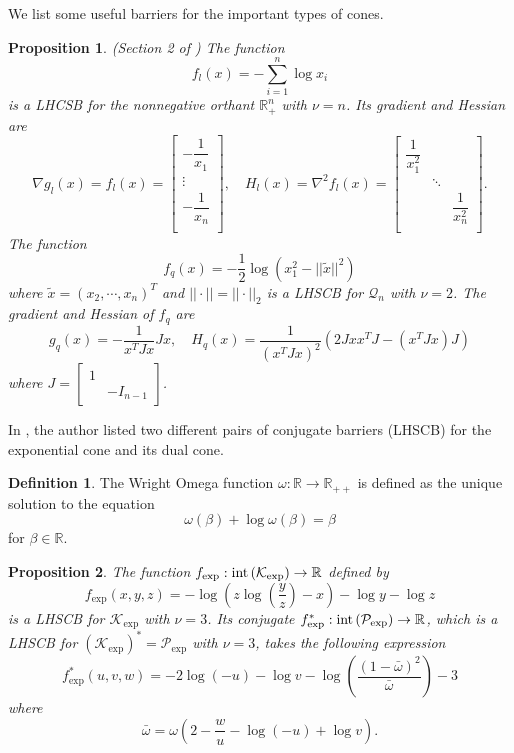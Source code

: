 \documentclass[11pt]{article}
\theoremstyle{definition}
\newtheorem{defin}{Definition}
\theoremstyle{plain}
\newtheorem{prop}{Proposition}
\begin{document}
We list some useful barriers for the important types of cones.

\begin{prop} \label{barriers_for_linear_and_lorentz_cone}
	\textnormal{(Section 2 of \cite{CVX})} The function 
	\[f_l(x) =-\sum_{i=1}^n \log x_i\]
	is a LHCSB for the nonnegative orthant $\mathbb{R}_+^{n}$ with $\nu = n$. Its gradient and Hessian are
	\[\nabla g_l(x) = f_l(x)= \begin{bmatrix}
	-\dfrac{1}{x_1} \\[2ex] \vdots \\[2ex] -\dfrac{1}{x_n} \\[1ex]
	\end{bmatrix},\quad 
	H_l(x) = \nabla^2 f_l(x) = \begin{bmatrix}
	\dfrac{1}{x_1^2} & 			  &				 			 \\[2ex] 
							& \ddots &						    \\[2ex] 
							&			 &	\dfrac{1}{x_n^2} \\[1ex]
	\end{bmatrix}. \]
	The function 
	\[f_q(x) = -\dfrac{1}{2}\log\left(x_1^2 - ||\tilde{x}||^2\right)\]
	where $\tilde{x} = \left(x_2,\cdots,x_n\right)^T$ and $||\cdot|| = ||\cdot||_2$ is a LHSCB for $\mathcal{Q}_n$ with $\nu = 2$. The gradient and Hessian of $f_q$ are
	\[g_q(x) = - \dfrac{1}{x^T J x} Jx, \quad H_q(x) =  \dfrac{1}{(x^T J x)^2}\left(2Jxx^T J - (x^T J x)J\right) \]
	where $J = \begin{bmatrix}
	1 & \\ & -I_{n-1}
	\end{bmatrix}$.
\end{prop}

In \cite{Akle_thesis}, the author listed two different pairs of conjugate barriers (LHSCB) for the exponential cone and its dual cone.

\begin{defin}
	The Wright Omega function $\omega: \mathbb{R} \rightarrow \mathbb{R}_{++}$ is defined as the unique solution to the equation 
	\[\omega(\beta) + \log \omega(\beta) = \beta \]
	for $\beta \in \mathbb{R}$.
\end{defin}

\begin{prop}
	The function $f_{\exp}: \textnormal{int}\left(\mathcal{K}_{\exp}\right) \rightarrow \mathbb{R}$ defined by 
	\[f_{\exp}(x,y,z) = -\log\left(z\log \left(\dfrac{y}{z}\right)-x\right) - \log y - \log z\]
	is a LHSCB for $\mathcal{K}_{\exp}$  with $\nu = 3$. 	Its conjugate $f_{\exp}^*: \textnormal{int}\left(\mathcal{P}_{\exp}\right) \rightarrow \mathbb{R}$, which is a LHSCB for $\left(\mathcal{K}_{\exp}\right)^* = \mathcal{P}_{\exp}$ with $\nu = 3$, takes the following expression 
	\[f_{\exp}^*(u,v,w) = -2 \log(-u) -\log v -\log\left(\dfrac{(1-\bar{\omega})^2}{\bar{\omega}}\right) - 3 \]
	where 
	\[\bar{\omega} = \omega\left(2-\dfrac{w}{u} - \log (-u) + \log v \right). \]
\end{prop}
\end{document}
